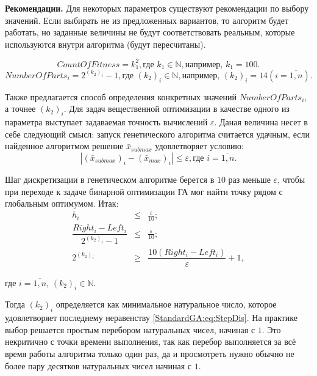 \textbf{Рекомендации.} Для некоторых параметров существуют рекомендации по выбору значений. Если выбирать не из предложенных вариантов, то алгоритм будет работать, но заданные величины не будут соответствовать реальным, которые используются внутри алгоритма (будут пересчитаны).

\begin{equation}
\label{StandardGA:eq:CountOfFitness2}
CountOfFitness=k_1^2,\text{где } k_1 \in \mathbb{N}, \text{например, } k_1=100.
\end{equation}
\begin{equation}
\label{StandardGA:eq:CountOfFitness}
NumberOfParts_i=2^{\left( k_2\right)_i }-1,\text{где } \left( k_2\right)_i \in \mathbb{N}, \text{например, } \left( k_2\right)_i=14 \left( i=\overline{1,n}\right) .
\end{equation}

Также предлагается способ определения конкретных значений $NumberOfParts_i $, а точнее $ \left( k_2\right)_i $. Для задач вещественной оптимизации в качестве одного из параметра выступает задаваемая точность вычислений $ \varepsilon $. Даная величина несет в себе следующий смысл: запуск генетического алгоритма считается удачным, если найденное алгоритмом решение $ \bar{x}_{submax}$ удовлетворяет условию:
\begin{equation}
\label{StandardGA:eq:varepsilon}
\left| \left( \bar{x}_{submax}\right)_i-\left( \bar{x}_{max}\right)_i\right| \leq\varepsilon, \text{где } i=\overline{1,n}.
\end{equation}

Шаг дискретизации в генетическом алгоритме берется в $ 10 $ раз меньше $ \varepsilon $, чтобы при переходе к задаче бинарной оптимизации ГА мог найти точку рядом с глобальным оптимумом. Итак:
\begin{eqnarray}
\label{StandardGA:eq:StepDis}
h_i&\leq&\frac{\varepsilon}{10};\nonumber\\
\dfrac{Right_i-Left_i}{2^{\left( k_2\right)_i }-1}&\leq&\frac{\varepsilon}{10};\nonumber\\
2^{\left( k_2\right)_i }&\geq&\dfrac{10\left(Right_i-Left_i \right) }{\varepsilon}+1,
\end{eqnarray}

где $ i=\overline{1,n} $, $ \left( k_2\right)_i \in \mathbb{N} $.

Тогда  $ \left( k_2\right)_i $ определяется как минимальное натуральное число, которое удовлетворяет последнему неравенству \ref{StandardGA:eq:StepDis}. На практике выбор решается простым перебором натуральных чисел, начиная с $ 1 $. Это некритично с точки времени выполнения, так как перебор выполняется за всё время работы алгоритма только один раз, да и просмотреть нужно обычно не более пару десятков натуральных чисел начиная с $ 1 $.

